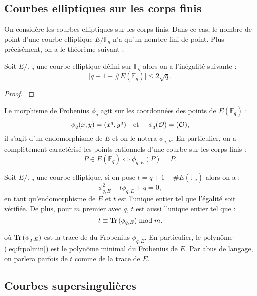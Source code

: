 \documentclass[a4paper]{article} %
\numberwithin{section}{part}
\numberwithin{equation}{section}
\newcommand\GF[1]{\mathbb{F}_{#1}}
\newcommand\Tr[1]{\textup{Tr}\left(#1\right)}
\newcommand\EO{\mathcal{O}}
\newcommand\etmath{\textup{\quad et \quad}}
\begin{document}
\subsection{Courbes elliptiques sur les corps finis}
On considère les courbes elliptiques sur les corps finis. Dans ce cas, le nombre
de point d'une courbe elliptique $E/\GF{q}$ n'a qu'un nombre fini de point. Plus
précisément, on a le théorème suivant :
\begin{thm}[Hasse]
\label{th:hasse}
Soit $E/\GF{q}$ une courbe elliptique défini sur $\GF{q}$ alors on a l'inégalité
suivante :
\begin{equation}
\vert{q + 1 - \#E(\GF{q})}\vert\leq 2\sqrt{q}.
\end{equation}
\end{thm}
\begin{proof}
\cite[Chap. V, th. 1.1]{Sil}
\end{proof}
Le morphisme de Frobenius $\phi_q$ agit sur les coordonnées des points de
$E(\overline{\mathbb{F}}_q)$ :
\begin{equation}
\phi_q(x,y) = (x^q, y^q)\etmath \phi_q(\EO) = (\EO),
\end{equation}
il s'agit d'un endomorphisme de $E$ et on le notera $\phi_{q,E}$. 
En particulier, on a complètement caractérisé les points rationnels d'une courbe
sur les corps finis :
\begin{equation}
P\in E(\GF{q}) \Leftrightarrow \phi_{q,E}(P) = P.
\end{equation}
\begin{prop}
Soit $E/\GF{q}$ une courbe elliptique, si on pose $t = q + 1 - \#E(\GF{q})$
alors on a :
\begin{equation}
\label{eq:frpolmin}
\phi_{q,E}^2 - t\phi_{q,E} + q = 0,
\end{equation}
en tant qu'endomorphisme de $E$ et $t$ est l'unique entier tel que l'égalité
soit vérifiée. De plus, pour $m$ premier avec $q$, $t$ est aussi l'unique entier
tel que :
\begin{equation}
t \equiv \Tr{\phi_{q,E}} \bmod m.
\end{equation}
\end{prop}
où $\Tr{\phi_{q,E}}$ est la trace de du Frobenius $\phi_{q,E}$. En particulier, 
le polynôme (\ref{eq:frpolmin}) est le polynôme minimal du
Frobenius de $E$. Par abus de langage, on parlera parfois de $t$ comme de la 
trace de $E$.

\subsection{Courbes supersingulières}
\label{sec:singcurve}
\vspace{0.3cm}
\end{document}

